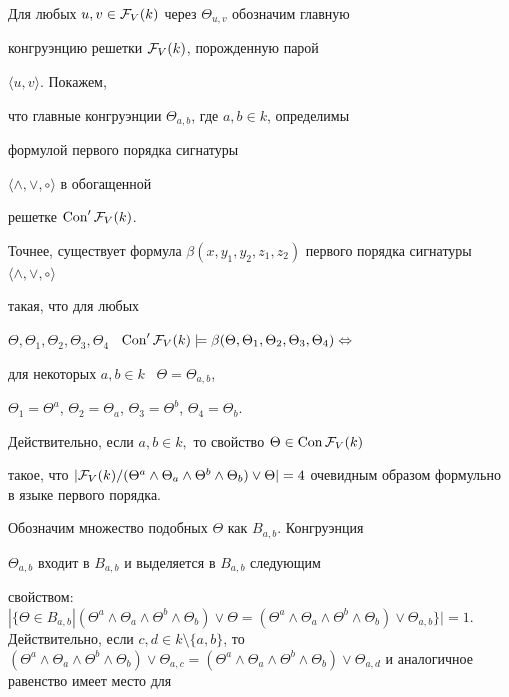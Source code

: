 \begin{pf}
Для любых $u,v\in{\cal F}_V(k)$ через $\Theta_{u,v}$ обозначим главную


конгруэнцию решетки ${\cal F}_V(k)$, порожденную парой


$\langle u,v\rangle$. Покажем,


что главные конгруэнции $\Theta_{a,b}$, где $a,b\in k$, определимы


формулой первого порядка сигнатуры


$\langle\wedge,\vee,\circ\rangle$ в обогащенной


решетке $\operatorname{Con} '{\cal F}_V(k)$.


Точнее, существует формула $\beta(x,y_1,y_2,z_1,


z_2)$ первого порядка сигнатуры $\langle\wedge,\vee,\circ\rangle$


такая, что для любых


$\Theta,\Theta_1,\Theta_2,\Theta_3,\Theta_4$ \ $\Con '{\cal F}_V(k)\models


\beta(\Theta,\Theta_1,\Theta_2,\Theta_3,\Theta_4)\Leftrightarrow$


для некоторых $a,b\in k$ \ $\Theta=\Theta_{a,b}$,


$\Theta_1=\Theta^a$, $\Theta_2=


\Theta_a$, $\Theta_3=\Theta^b$, $\Theta_4=\Theta_b$.


Действительно, если $a,b\in k,$ то свойство $\Theta\in \operatorname{Con}{\cal F}_V(k)$


такое, что $|{\cal F}_V(k)/(\Theta^a\wedge\Theta_a\wedge\Theta^b\wedge


\Theta_b)\vee\Theta|=4$ очевидным образом формульно в языке первого порядка.


Обозначим множество подобных $\Theta$ как $B_{a,b}$. Конгруэнция


$\Theta_{a,b}$ входит в $B_{a,b}$ и выделяется в $B_{a,b}$ следующим


свойством: $|\{\Theta\in B_{a,b}|(\Theta^a\wedge\Theta_a\wedge\Theta^b\wedge


\Theta_b)\vee\Theta=(\Theta^a\wedge\Theta_a\wedge\Theta^b\wedge


\Theta_b)\vee\Theta_{a,b}\}|=1$. Действительно, если $c,d\in k\setminus


\{a,b\}$, то $(\Theta^a\wedge\Theta_a\wedge\Theta^b\wedge


\Theta_b)\vee\Theta_{a,c}=(\Theta^a\wedge\Theta_a\wedge\Theta^b\wedge


\Theta_b)\vee\Theta_{a,d}$ и аналогичное равенство имеет место для 



\end{pf}
